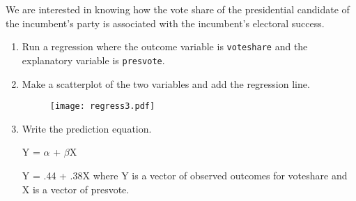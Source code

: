 \documentclass[12pt,letterpaper]{article}
\begin{document}
\noindent We are interested in knowing how the vote share of the presidential candidate of the incumbent's party is associated with the incumbent's electoral success.
	\vspace{.25cm}
	\begin{enumerate}
		\item Run a regression where the outcome variable is \texttt{voteshare} and the explanatory variable is \texttt{presvote}.
		 
		\vspace{.25cm} 
			
		\item Make a scatterplot of the two variables and add the regression line. 
		  
		
		\begin{figure}[h!]\centering
		\caption{\footnotesize }
		\label{fig:plot_1}
		\texttt{[image: regress3.pdf]}
		\end{figure}
		\vspace{.25cm}
		
		\newpage

		\item Write the prediction equation.
		
		Y = $\alpha$ + $\beta$X 
		
		\vspace{.1cm}
		
		Y = .44 + .38X where Y is a vector of observed outcomes for voteshare and X is a vector of presvote.
		
	\end{enumerate}
	
\end{document}
